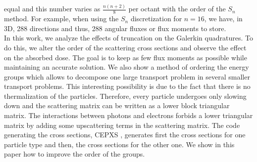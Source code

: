 equal and this number varies as $\frac{n(n+2)}{8}$ per octant with the order of the $S_n$ method.  
For example, when using the $S_n$ discretization for $n=16$, we have, in 3D, 
288 directions and thus, 288 angular fluxes or flux moments to store.\\
In this work, we analyze the effects of truncation on the Galerkin quadratures.
To do this, we
alter the order of the scattering cross sections and observe the effect on the 
absorbed dose. The goal is to keep as few flux moments as possible while 
maintaining an accurate solution.  We also show a method of ordering
the energy groups which allows to decompose one large transport problem in
several smaller transport problems. This interesting possibility is due to
the fact that there is no thermalization of the particles. Therefore, every
particle undergoes only slowing down and the scattering matrix can be written
as a lower block triangular matrix. The interactions between photons and
electrons forbids a lower triangular matrix by adding some
upscattering terms in the scattering matrix. The code generating the cross
sections, CEPXS \cite{cepxs}, generates first the cross sections for one
particle type and then, the cross sections for the other one. We show in this
paper how to improve the order of the groups.
